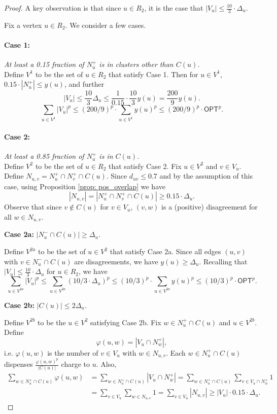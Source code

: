 \documentclass[11pt]{article}
\begin{document}
\begin{proof}
A key observation is that since $u \in R_2$, it is the case that $|V_u| \leq \frac{10}{3} \cdot \Delta_u$. 

\medskip 

Fix a vertex $u \in R_2$. We consider a few cases. 
\paragraph{Case 1: }\emph{At least a 0.15 fraction of $N_u^+$ is in clusters other than $C(u)$.}\\
Define $V^1$ to be the set of $u \in R_2$ that satisfy Case 1. Then for $u \in V^1$,  $0.15 \cdot |N_u^+| \leq y(u)$, and further
$$|V_u| \leq \frac{10}{3}\Delta_u \leq \frac{1}{0.15}\cdot \frac{10}{3} y(u) = \frac{200}{9}y(u).$$
$$ \boxed{\sum_{u \in V^1} |V_u|^p \leq (200/9)^p \cdot \sum_{u \in V^1} y(u)^p \leq (200/9)^p \cdot \textsf{OPT}^p.}$$

\paragraph{Case 2: }\emph{At least a 0.85 fraction of $N_u^+$ is in $C(u)$. }\\ 
Define $V^2$ to be the set of $u \in R_2$ that satisfy Case 2. 
Fix $u \in V^2$ and $v \in V_u$. Define $N_{u,v} = N_u^+ \cap N_v^+ \cap C(u)$. Since $d_{uv} \leq 0.7$ and by the assumption of this case, using Proposition \ref{prop: pos_overlap} we have  
$$|N_{u,v}| = |N_u^+ \cap N_v^+ \cap C(u)| \geq 0.15 \cdot \Delta_u.$$
Observe that since $v \not 
\in C(u)$ for $v \in V_u$, $(v,w)$ is a (positive) disagreement for all $w \in N_{u,v}$. 

\noindent  \textbf{Case 2a: }\emph{$|N_u^- \cap C(u)| \geq \Delta_u$.} 

    Define $V^{2a}$ to be the set of $u \in V^2$ that satisfy Case 2a. Since all edges $(u,v)$ with $v \in N_u^- \cap C(u)$ are disagreements, we have $y(u) \geq \Delta_u$. Recalling that $|V_u| \leq \frac{10}{3} \cdot \Delta_u$ for $u \in R_2$, we have
    \[\boxed{\sum_{u \in V^{2a}} |V_u|^p \leq \sum_{u \in V^{2a}} (10/3\cdot\Delta_u)^p \leq (10/3)^p \cdot \sum_{u \in V^{2a}} y(u)^p \leq (10/3)^p \cdot \textsf{OPT}^p.}\]

\noindent \textbf{Case 2b: }\emph{$|C(u)| \leq 2\Delta_u$.} 

    Define $V^{2b}$ to be the $u \in V^2$ satisfying Case 2b. 
    Fix $w \in N_u^+ \cap C(u)$ and $u \in V^{2b}$. Define 
    $$\varphi(u,w) = |V_u \cap N_w^+|,$$
    i.e. $\varphi(u,w)$ is the number of $v \in V_u$ with $w \in N_{u,v}$. 
    Each $w \in N_u^+ \cap C(u)$ dispenses 
    $\frac{\varphi(u,w)^p}{|C(u)|}$
    charge to $u$. Also, 
    \begin{align*}\sum_{w \in N_u^+ \cap C(u)} \varphi(u,w) &= 
    \sum_{w \in N_u^+ \cap C(u)} |V_u \cap N_w^+|
    = \sum_{w \in N_u^+ \cap C(u)} \sum_{v \in V_u\cap N_w^+}1 \\
    &= \sum_{v \in V_u} \sum_{w \in N_{u,v}}1 
    =\sum_{v \in V_u}  |N_{u,v}| \geq |V_u| \cdot 0.15 \cdot \Delta_u.
    \end{align*}
    

\end{proof}
\end{document}
